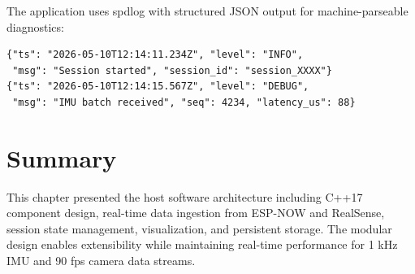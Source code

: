 The application uses spdlog with structured JSON output for machine-parseable diagnostics:

\begin{verbatim}
{"ts": "2026-05-10T12:14:11.234Z", "level": "INFO",
 "msg": "Session started", "session_id": "session_XXXX"}
{"ts": "2026-05-10T12:14:15.567Z", "level": "DEBUG",
 "msg": "IMU batch received", "seq": 4234, "latency_us": 88}
\end{verbatim}

\section{Summary}

This chapter presented the host software architecture including C++17 component design, real-time data ingestion from ESP-NOW and RealSense, session state management, visualization, and persistent storage. The modular design enables extensibility while maintaining real-time performance for 1 kHz IMU and 90 fps camera data streams.

\newpage